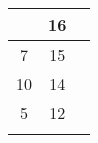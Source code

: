 {\begin{tabularx}{\textwidth}{p{.1em}cc}
\begin{tabular}[t]{cc}
\multicolumn{1}{|c|}{12}                                                        & \multicolumn{1}{c|}{16}                                                             \\ \hline
\multicolumn{1}{|c|}{7}                                                        & \multicolumn{1}{c|}{15}                                                             \\ \hline
\multicolumn{1}{|c|}{10}                                                        & \multicolumn{1}{c|}{14}                                                             \\ \hline
\multicolumn{1}{|c|}{5}                                                        & \multicolumn{1}{c|}{12}                                                             \\ \hline
\end{tabular}

\end{tabularx}}